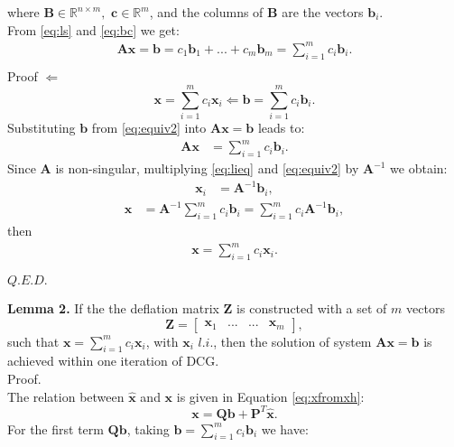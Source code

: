 \documentclass[12pt]{article}
\numberwithin{equation}{section}
\begin{document}
where $\mathbf{B} \in \mathbb{R}^{n\times m},$ $\mathbf{c} \in \mathbb{R}^{m}$, and the columns of $\mathbf{B}$
are the vectors $\mathbf{b}_i$.\\
From \eqref{eq:ls} and \eqref{eq:bc} we get:
\begin{align*}
\mathbf{A}\mathbf{x}=\mathbf{b}=c_1\mathbf{b}_1+...+c_m\mathbf{b}_m=\sum_{i=1}^m {c}_i\mathbf{b}_i.\\
\end{align*}
Proof $\Leftarrow $
\begin{equation}\label{eq:equiv2}
\mathbf{x}=\sum_{i=1}^m {c}_i\mathbf{x}_i\Leftarrow \mathbf{b}=\sum_{i=1}^m {c}_i\mathbf{b}_i .
\end{equation}
Substituting $\mathbf{b}$ from \eqref{eq:equiv2} into $\mathbf{A}\mathbf{x}=\mathbf{b}$ leads to:
\begin{align}%
\mathbf{A}\mathbf{x}&=\sum_{i=1}^m {c}_i\mathbf{b}_i.
\end{align}
Since $\mathbf{A}$ is non-singular, multiplying \eqref{eq:lieq} and \eqref{eq:equiv2} by $\mathbf{A}^{-1}$ we obtain:
\begin{align*}%
\mathbf{x}_i&=\mathbf{A}^{-1}\mathbf{b}_i,
\end{align*}
\begin{align*}%
\mathbf{x}&=\mathbf{A}^{-1}\sum_{i=1}^m {c}_i\mathbf{b}_i=\sum_{i=1}^m {c}_i\mathbf{A}^{-1}\mathbf{b}_i,
\end{align*}
then 
\begin{align}\label{eq:equiv21}
\mathbf{x}=\sum_{i=1}^m {c}_i\mathbf{x}_i.
\end{align}
\begin{flushright}
$Q.E.D.$                  
\end{flushright}
\textbf{Lemma 2.}
If the the deflation matrix $\mathbf{Z}$ is constructed with a set of $m$ vectors 
\begin{equation}
 \mathbf{Z}=
\begin{bmatrix}
\mathbf{x}_1&...&...&\mathbf{x}_m
\end{bmatrix}, 
\end{equation}
such that $\mathbf{x}=\sum_{i=1}^m {c}_i\mathbf{x}_i$, with $\mathbf{x}_i$ $l.i.$, then the solution of
system $\mathbf{A}\mathbf{x}=\mathbf{b}$ is achieved within one iteration of DCG.\\
Proof.\\
The relation between $\mathbf{\hat{x}}$ and $\mathbf{x}$ is given in Equation \eqref{eq:xfromxh}:
\begin{equation*}
    \mathbf{x}=\mathbf{Q}\mathbf{b}+\mathbf{P}^T\mathbf{\hat{x}}. 
\end{equation*}
For the first term $\mathbf{Q}\mathbf{b}$, taking $\mathbf{b}=\sum_{i=1}^m {c}_i\mathbf{b}_i$ we have:
\end{document}
